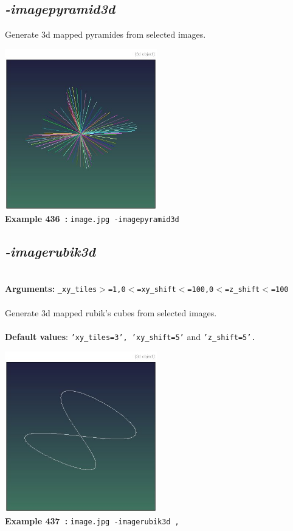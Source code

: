 \documentclass[a4paper,11pt,twoside]{book}
\begin{document}
\subsection{\emph{-imagepyramid3d} }\vspace*{-0.5em}
Generate 3d mapped pyramides from selected images.
\begin{center}\includegraphics[keepaspectratio=true,height=7cm,width=\textwidth]{img/gmic_def436.jpg}\\
{\footnotesize \textbf{Example 436~:} \texttt{image.jpg -imagepyramid3d}}
\end{center}

\subsection{\emph{-imagerubik3d} }\vspace*{-0.5em}
~\\\textbf{Arguments: } 
{\small \texttt{\_xy\_tiles$>$=1,0$<$=xy\_shift$<$=100,0$<$=z\_shift$<$=100}}\\~\\
Generate 3d mapped rubik's cubes from selected images.
~\\~\\\textbf{Default values}: {\small \texttt{'xy\_tiles=3', 'xy\_shift=5'} and \texttt{'z\_shift=5'.}}
\begin{center}\includegraphics[keepaspectratio=true,height=7cm,width=\textwidth]{img/gmic_def437.jpg}\\
{\footnotesize \textbf{Example 437~:} \texttt{image.jpg -imagerubik3d ,}}
\end{center}
\end{document}
